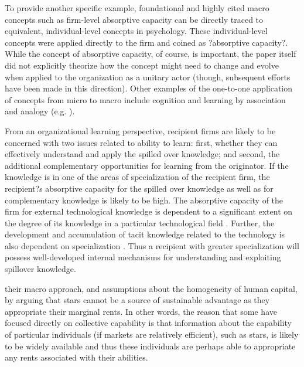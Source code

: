\documentclass[12pt,letterpaper]{article}
\begin{document}
To provide another specific example, foundational and highly cited macro concepts such as firm-level absorptive capacity \citep{Cohen1990} can be directly traced to equivalent, individual-level concepts in psychology.  These individual-level concepts were applied directly to the firm and coined as ?absorptive capacity?. While the concept of absorptive capacity, of course, is important, the paper itself did not explicitly theorize how the concept might need to change and evolve when applied to the organization as a unitary actor (though, subsequent efforts have been made in this direction). Other examples of the one-to-one application of concepts from micro to macro include cognition and learning by association and analogy (e.g. \cite{Gavetti2012b, Gavetti2005b}).



From an organizational learning perspective, recipient firms are likely to be concerned with two issues related to ability to learn: first, whether they can effectively understand and apply the spilled over knowledge; and second, the additional complementary opportunities for learning from the originator. If the knowledge is in one of the areas of specialization of the recipient firm, the recipient?s absorptive capacity \citep{Cohen1990} for the spilled over knowledge as well as for complementary knowledge is likely to be high. The absorptive capacity of the firm for external technological knowledge is dependent to a significant extent on the degree of its knowledge in a particular technological field \citep{Schoenmakers2006}. Further, the development and accumulation of tacit knowledge \citep{Polanyi1966} related to the technology is also dependent on specialization \citep{Enright1991}. Thus a recipient with greater specialization will possess well-developed internal mechanisms for understanding and exploiting spillover knowledge.

 their macro approach, and assumptions about the homogeneity of human capital, by arguing that stars cannot be a source of sustainable advantage as they appropriate their marginal rents. In other words, the reason that some have focused directly on collective capability is that information about the capability of particular individuals (if markets are relatively efficient), such as stars, is likely to be widely available and thus these individuals are perhaps able to appropriate any rents associated with their abilities.
 
\end{document}

